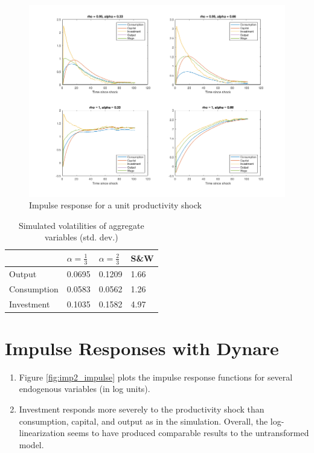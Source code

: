 \documentclass[11pt]{article}
\begin{document}
    \begin{figure}[h]
        \centering
        \caption{Impulse response for a unit productivity shock}
        \label{fig:imp1_impulse}
        \includegraphics[width=\textwidth]{imp1_impulse.png}
    \end{figure}

    \begin{table}[h] \centering
    \caption{Simulated volatilities of aggregate variables (std. dev.)}
    \label{tab:volatilities}
    \begin{tabular}{p{2.5cm}p{2.5cm}p{2.5cm}p{2.5cm}}
    \hline
     & $\alpha = \frac{1}{3}$ & $\alpha = \frac{2}{3}$ & S\&W \tabularnewline
    \hline
    Output & 0.0695 & 0.1209 & 1.66 \tabularnewline
    Consumption & 0.0583 & 0.0562 & 1.26 \tabularnewline
    Investment & 0.1035 & 0.1582 & 4.97 \tabularnewline
    \hline
    \end{tabular}
    \end{table}

\section{Impulse Responses with Dynare}

    \begin{enumerate}
        \item Figure \ref{fig:imp2_impulse} plots the impulse response functions for several endogenous variables (in log units).
        \item Investment responds more severely to the productivity shock than consumption, capital, and output as in the simulation. Overall, the log-linearization seems to have produced comparable results to the untransformed model.
    \end{enumerate}
\end{document}
